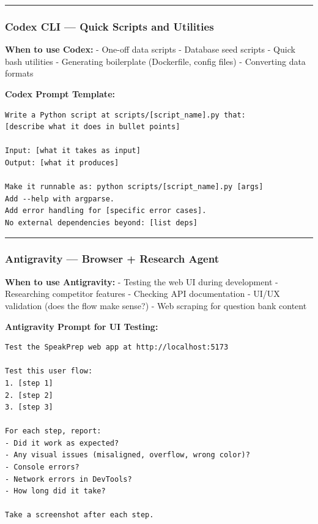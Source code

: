 \documentclass[
  11pt,
]{article}
\begin{document}
\begin{center}\rule{0.5\linewidth}{0.5pt}\end{center}

\hypertarget{codex-cli-quick-scripts-and-utilities}{%
\subsubsection{Codex CLI --- Quick Scripts and
Utilities}\label{codex-cli-quick-scripts-and-utilities}}

\textbf{When to use Codex:} - One-off data scripts - Database seed
scripts - Quick bash utilities - Generating boilerplate (Dockerfile,
config files) - Converting data formats

\textbf{Codex Prompt Template:}

\begin{lstlisting}
Write a Python script at scripts/[script_name].py that:
[describe what it does in bullet points]

Input: [what it takes as input]
Output: [what it produces]

Make it runnable as: python scripts/[script_name].py [args]
Add --help with argparse.
Add error handling for [specific error cases].
No external dependencies beyond: [list deps]
\end{lstlisting}

\begin{center}\rule{0.5\linewidth}{0.5pt}\end{center}

\hypertarget{antigravity-browser-research-agent}{%
\subsubsection{Antigravity --- Browser + Research
Agent}\label{antigravity-browser-research-agent}}

\textbf{When to use Antigravity:} - Testing the web UI during
development - Researching competitor features - Checking API
documentation - UI/UX validation (does the flow make sense?) - Web
scraping for question bank content

\textbf{Antigravity Prompt for UI Testing:}

\begin{lstlisting}
Test the SpeakPrep web app at http://localhost:5173

Test this user flow:
1. [step 1]
2. [step 2]
3. [step 3]

For each step, report:
- Did it work as expected?
- Any visual issues (misaligned, overflow, wrong color)?
- Console errors?
- Network errors in DevTools?
- How long did it take?

Take a screenshot after each step.
\end{lstlisting}
\end{document}
